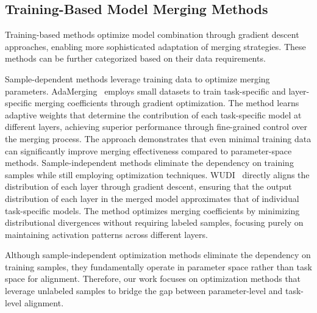 \subsection{Training-Based Model Merging Methods}

Training-based methods optimize model combination through gradient descent approaches, enabling more sophisticated adaptation of merging strategies. These methods can be further categorized based on their data requirements.

Sample-dependent methods leverage training data to optimize merging parameters. AdaMerging~\citep{yang2023adamerging} employs small datasets to train task-specific and layer-specific merging coefficients through gradient optimization. The method learns adaptive weights that determine the contribution of each task-specific model at different layers, achieving superior performance through fine-grained control over the merging process. The approach demonstrates that even minimal training data can significantly improve merging effectiveness compared to parameter-space methods.
Sample-independent methods eliminate the dependency on training samples while still employing optimization techniques. WUDI~\citep{cheng2025whoever, wei2025unifying} directly aligns the distribution of each layer through gradient descent, ensuring that the output distribution of each layer in the merged model approximates that of individual task-specific models. The method optimizes merging coefficients by minimizing distributional divergences without requiring labeled samples, focusing purely on maintaining activation patterns across different layers.

Although sample-independent optimization methods eliminate the dependency on training samples, they fundamentally operate in parameter space rather than task space for alignment. Therefore, our work focuses on optimization methods that leverage unlabeled samples to bridge the gap between parameter-level and task-level alignment.